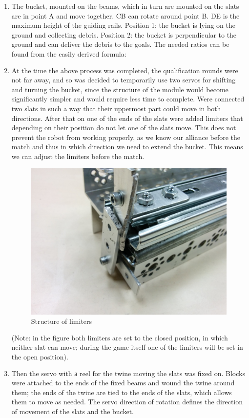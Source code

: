 \begin{enumerate}
  \item The bucket, mounted on the beams, which in turn are mounted on the slats are in point A and move together. CB can rotate around point B. DE is the maximum height of the guiding rails. Position 1: the bucket is lying on the ground and collecting debris. Position 2: the bucket is perpendicular to the ground and can deliver the debris to the goals. The needed ratios can be found from the easily derived formula: %
  \item At the time the above process was completed, the qualification rounds were not far away, and so was decided to temporarily use two servos for shifting and turning the bucket, since the structure of the module would become significantly simpler and would require less time to complete. Were connected two slats in such a way that their uppermost part could move in both directions. After that on one of the ends of the slats were added limiters that depending on their position do not let one of the slats move. This does not prevent the robot from working properly, as we know our alliance before the match and thus in which direction we need to extend the bucket. This means we can adjust the limiters before the match.
    \begin{figure}[h]
  	  \begin{minipage}[h]{1\linewidth}
  	  	  \includegraphics[scale = 0.05]{3Engineering/6Specifications_for_modules/bucket/images/02}
  		  \caption{Structure of limiters}
    	\end{minipage}
    \end{figure}
  (Note: in the figure both limiters are set to the closed position, in which neither slat can move; during the game itself one of the limiters will be set in the open position). 
  \item Then the servo with а reel for the twine moving the slats was fixed on. Blocks were attached to the ends of the fixed beams and wound the twine around them; the ends of the twine are tied to the ends of the slats, which allows them to move as needed. The servo direction of rotation defines the direction of movement of the slats and the bucket. 	
  

\end{enumerate}
